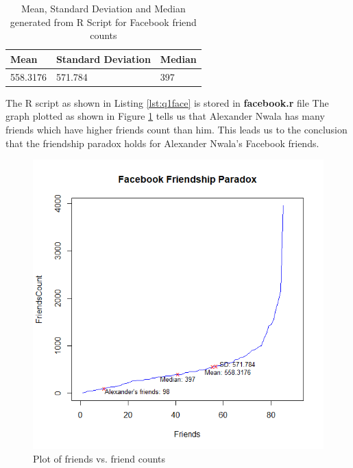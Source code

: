 \documentclass[letterpaper,11pt]{article}
\begin{document}
\begin{table}[htb]
\centering
\begin{tabular}{ | l | l | l |}
\hline
\textbf{Mean} & \textbf{Standard Deviation} & \textbf{Median} \\
\hline
558.3176 & 571.784 & 397 \\
\hline
\end{tabular}
\caption{Mean, Standard Deviation and Median generated from R Script for Facebook friend counts}
\label{table:q1summary}
\end{table}


The R script as shown in Listing \ref{lst:q1face} is stored in \textbf{facebook.r} file 
The graph plotted as shown in Figure \ref{fig:q1facebookplot} tells us that Alexander Nwala has many friends which have higher friends count than him. This leads us to the conclusion that the friendship paradox holds for Alexander Nwala’s Facebook friends.



\begin{figure}[h]
\centering
\includegraphics[scale=0.6]{facebook.png}
\caption{Plot of friends vs. friend counts}
\label{fig:q1facebookplot}
\end{figure}
\end{document}
